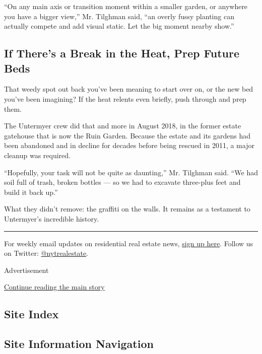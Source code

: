 ``On any main axis or transition moment within a smaller garden, or
anywhere you have a bigger view,'' Mr. Tilghman said, ``an overly fussy
planting can actually compete and add visual static. Let the big moment
nearby show.''

\hypertarget{if-theres-a-break-in-the-heat-prep-future-beds}{%
\subsection{If There's a Break in the Heat, Prep Future
Beds}\label{if-theres-a-break-in-the-heat-prep-future-beds}}

That weedy spot out back you've been meaning to start over on, or the
new bed you've been imagining? If the heat relents even briefly, push
through and prep them.

The Untermyer crew did that and more in August 2018, in the former
estate gatehouse that is now the Ruin Garden. Because the estate and its
gardens had been abandoned and in decline for decades before being
rescued in 2011, a major cleanup was required.

``Hopefully, your task will not be quite as daunting,'' Mr. Tilghman
said. ``We had soil full of trash, broken bottles --- so we had to
excavate three-plus feet and build it back up.''

What they didn't remove: the graffiti on the walls. It remains as a
testament to Untermyer's incredible history.

\begin{center}\rule{0.5\linewidth}{\linethickness}\end{center}

For weekly email updates on residential real estate news,
\href{http://www.nytimes3xbfgragh.onion/newsletters/realestate/}{sign up
here}. Follow us on Twitter:
\href{https://twitter.com/nytrealestate}{@nytrealestate}.

Advertisement

\protect\hyperlink{after-bottom}{Continue reading the main story}

\hypertarget{site-index}{%
\subsection{Site Index}\label{site-index}}

\hypertarget{site-information-navigation}{%
\subsection{Site Information
Navigation}\label{site-information-navigation}}

